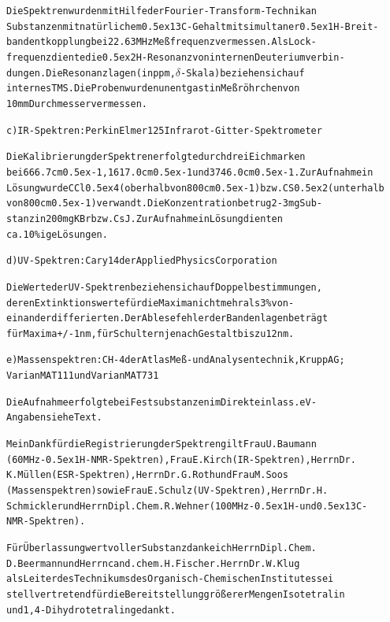 \documentclass[a4paper,11pt]{article}
\begin{document}
\begin{alltt}
   Die Spektren wurden mit Hilfe der Fourier-Transform-Technik an
   Substanzen mit natürlichem \raise0.5ex\hbox{13}C-Gehalt mit simultaner \raise0.5ex\hbox{1}H-Breit-
   bandentkopplung bei 22.63 MHz Meßfrequenz vermessen. Als Lock-
   frequenz diente die \raise0.5ex\hbox{2}H-Resonanz von internen Deuteriumverbin-
   dungen. Die Resonanzlagen (in ppm, \(\delta\)-Skala) beziehen sich auf
   internes TMS. Die Proben wurden unentgast in Meßröhrchen von
   10 mm Durchmesser vermessen.

c) IR-Spektren: Perkin Elmer 125 Infrarot-Gitter-Spektrometer

   Die Kalibrierung der Spektren erfolgte durch drei Eichmarken
   bei 666.7 cm\raise0.5ex\hbox{-1}‚ 1617.0 cm\raise0.5ex\hbox{-1} und 3746.0 cm\raise0.5ex\hbox{-1}. Zur Aufnahme in
   Lösung wurde CCl\lower0.5ex\hbox{4} (oberhalb von 800 cm\raise0.5ex\hbox{-1}) bzw. CS\lower0.5ex\hbox{2} (unterhalb
   von 800 cm\raise0.5ex\hbox{-1}) verwandt. Die Konzentration betrug 2 - 3 mg Sub-
   stanz in 200 mg KBr bzw. CsJ. Zur Aufnahme in Lösung dienten
   ca. 10 \%ige Lösungen.

d) UV-Spektren: Cary 14 der Applied Physics Corporation

   Die Werte der UV-Spektren beziehen sich auf Doppelbestimmungen,
   deren Extinktionswerte für die Maxima nicht mehr als 3 \% von-
   einander differierten. Der Ablesefehler der Bandenlagen beträgt
   für Maxima +/- 1 nm, für Schultern je nach Gestalt bis zu 12 nm.

e) Massenspektren: CH-4 der Atlas Meß- und Analysentechnik, Krupp AG;
                   Varian MAT 111 und Varian MAT 731

   Die Aufnahme erfolgte bei Festsubstanzen im Direkteinlass. eV-
   Angaben siehe Text.

\newpage
{}


Mein Dank für die Registrierung der Spektren gilt Frau U. Baumann
(60 MHz-\raise0.5ex\hbox{1}H-NMR-Spektren)‚ Frau E. Kirch (IR-Spektren), Herrn Dr.
K. Müllen (ESR-Spektren), Herrn Dr. G. Roth und Frau M. Soos
(Massenspektren) sowie Frau E. Schulz (UV-Spektren), Herrn Dr. H.
Schmickler und Herrn Dipl. Chem. R. Wehner (100 MHz-\raise0.5ex\hbox{1}H- und \raise0.5ex\hbox{13}C-
NMR-Spektren).

Für Überlassung wertvoller Substanz danke ich Herrn Dipl. Chem.
D. Beermann und Herrn cand. chem. H. Fischer. Herrn Dr. W. Klug
als Leiter des Technikums des Organisch-Chemischen Institutes sei
stellvertretend für die Bereitstellung größerer Mengen Isotetralin
und 1,4-Dihydrotetralin gedankt.


\end{alltt}
\end{document}
